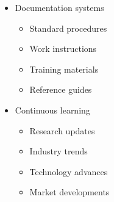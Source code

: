 \begin{itemize}
\begin{itemize}
        \item Documentation systems
        \begin{itemize}
            \item Standard procedures
            \item Work instructions
            \item Training materials
            \item Reference guides
        \end{itemize}
        
        \item Continuous learning
        \begin{itemize}
            \item Research updates
            \item Industry trends
            \item Technology advances
            \item Market developments
        \end{itemize}
    \end{itemize}
\end{itemize}

